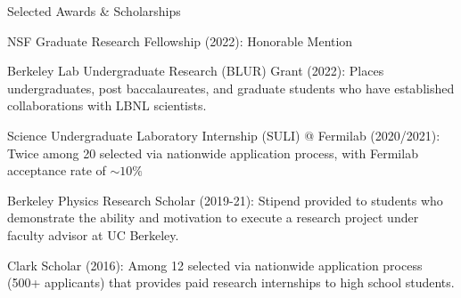\documentclass{resume} %
\begin{document}
\begin{rSection}{Selected Awards \& Scholarships}
\begin{rSubsection}{}{ }{}{}

\item NSF Graduate Research Fellowship (2022): Honorable Mention

\item Berkeley Lab Undergraduate Research (BLUR) Grant (2022): Places undergraduates, post baccalaureates, and graduate students who have established collaborations with LBNL scientists.

\item Science Undergraduate Laboratory Internship (SULI) @ Fermilab (2020/2021): Twice among 20 selected via nationwide application process, with Fermilab acceptance rate of $\sim10\%$

\item Berkeley Physics Research Scholar (2019-21): Stipend provided to students who demonstrate the ability and motivation to execute a research project under faculty advisor at UC Berkeley.

\item Clark Scholar (2016): Among 12 selected via nationwide application process (500+ applicants) that provides paid research internships to high school students.
\end{rSubsection}


\end{rSection}
\end{document}
